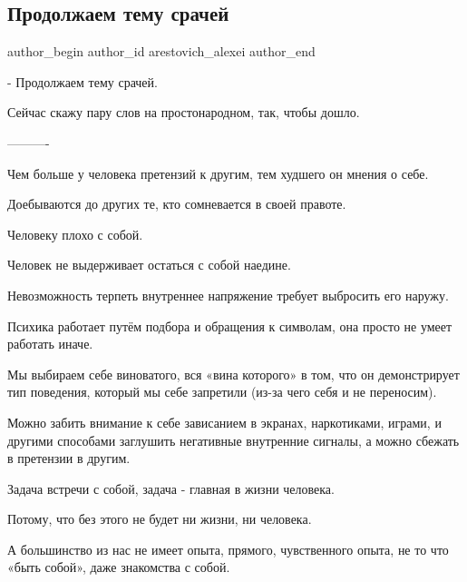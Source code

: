  
 
 
 
 

\subsection{Продолжаем тему срачей}
\label{sec:13_01_2023.fb.arestovich_alexei.1.prodolzhaem_temu_sra}

\ifcmt
 author_begin
   author_id arestovich_alexei
 author_end
\fi

- Продолжаем тему срачей.

Сейчас скажу пару слов на простонародном, так, чтобы дошло. 

———-

Чем больше у человека претензий к другим, тем худшего он мнения о себе.

Доебываются до других те, кто сомневается в своей правоте.

Человеку плохо с собой.

Человек не выдерживает остаться с собой наедине.

Невозможность терпеть внутреннее напряжение требует выбросить его наружу.

Психика работает путём подбора и обращения к символам, она просто не умеет
работать иначе.

Мы выбираем себе виноватого, вся «вина которого» в том, что он демонстрирует
тип поведения, который мы себе запретили (из-за чего себя и не переносим).

Можно забить внимание к себе зависанием в экранах, наркотиками, играми, и
другими способами заглушить негативные внутренние сигналы, а можно сбежать в
претензии в другим.

Задача встречи с собой, задача - главная в жизни человека.

Потому, что без этого не будет ни жизни, ни человека.

А большинство из нас не имеет опыта, прямого, чувственного опыта, не то что
«быть собой», даже знакомства с собой.

